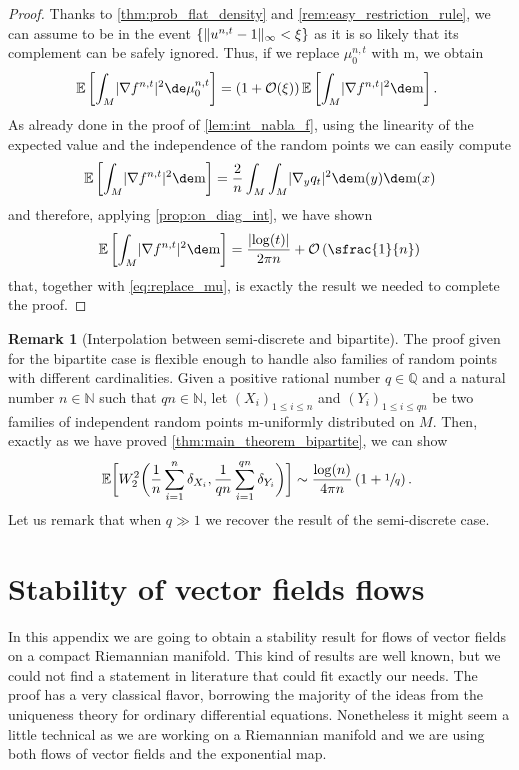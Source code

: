 \documentclass[JEP,XML,SOM,Unicode]{cedram}
\newcounter{results}[section]
\theoremstyle{plain}
\theoremstyle{definition}
\newtheorem{remark}[results]{Remark}
\numberwithin{equation}{section}
\newcommand{\NN}{\ensuremath{\mathbb N}}
\newcommand{\QQ}{\ensuremath{\mathbb Q}}
\newcommand{\E}[1]{\ensuremath{\operatorname{\mathbb{E}}\left[#1\right]}}
\newcommand{\bbE}[1]{\ensuremath{\operatorname{\mathbb{E}}\biggl[#1\biggr]}}
\newcommand{\bigo}{\ensuremath{\mathcal{O}}}
\newcommand{\fullstop}{\ensuremath{\text{. }}}
\newcommand{\m}{\ensuremath{\mathrm m}}
\DeclarePairedDelimiter\abs{\lvert}{\rvert}
\DeclarePairedDelimiter\norm{\lVert}{\rVert}
\begin{document}
\begin{proof}
Thanks to \cref{thm:prob_flat_density} and \cref{rem:easy_restriction_rule}, we can assume
to be in the event \hbox{$\{\norm{u^{n,t}-1}_\infty < \xi\}$} as it is so likely that its complement
can be safely ignored.
Thus, if we replace $\mu_0^{n,t}$ with $\m$, we obtain
\begin{equation}\label{eq:replace_mu}
\E{\int_M \abs{\nabla f^{n,t}}^2\de\mu_0^{n,t} }
= (1+\bigo(\xi))\E{\int_M \abs{\nabla f^{n,t}}^2\de\m} \fullstop
\end{equation}
As already done in the proof of \cref{lem:int_nabla_f}, using the linearity of the expected value and the
independence of the random points we can easily compute
\begin{equation*}
\E{\int_M \abs{\nabla f^{n,t}}^2\de\m}
= \frac2n\int_M\int_M\abs{\nabla_y q_t}^2\de\m(y)\de\m(x)
\end{equation*}
and therefore, applying \cref{prop:on_diag_int}, we have shown
\begin{equation*}
\E{\int_M\abs{\nabla f^{n,t}}^2\de\m}
= \frac{\abs{\log(t)}}{2\pi n} + \bigo\left(\sfrac{1}{n}\right)
\end{equation*}
that, together with \cref{eq:replace_mu}, is exactly the result we needed to complete the proof.
\end{proof}

\begin{remark}[Interpolation between semi-discrete and bipartite]
The proof given for the bipartite case is flexible enough to handle also families of random points with
different cardinalities.
Given a positive rational number $q\in\QQ$ and a natural number $n\in\NN$ such that $qn\in\NN$, let
$(X_i)_{1\le i\le n}$ and $(Y_i)_{1\le i\le qn}$ be two families of independent random points $\m$-uniformly
distributed on $M$. Then, exactly as we have proved \cref{thm:main_theorem_bipartite}, we can show
\begin{equation*}
\bbE{W^2_2\biggl(\frac1n\sum_{i=1}^n\delta_{X_i}, \frac1{qn}\sum_{i=1}^{qn}\delta_{Y_i}\biggr)}
\sim \frac{\log(n)}{4\pi n}\left(1+\sfrac1q\right) \fullstop
\end{equation*}
Let us remark that when $q\gg 1$ we recover the result of the semi-discrete case.
\end{remark}

\appendix
\section{Stability of vector fields flows}\label{app:stability_flow}
In this appendix we are going to obtain a stability result for flows of vector fields on a compact Riemannian
manifold.
This kind of results are well known, but we could not find a statement in literature that could fit exactly our
needs. The proof has a very classical flavor, borrowing the majority of the ideas from the
uniqueness theory for ordinary differential equations.
Nonetheless it might seem a little technical as we are working on a Riemannian manifold and we are using
both flows of
vector fields and the exponential map.
\end{document}
